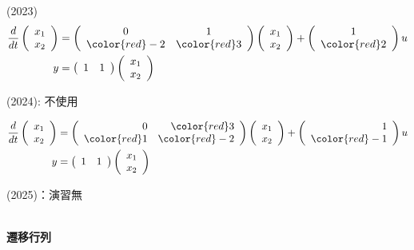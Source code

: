 (2023)
\begin{align*}
	\frac{d}{dt}
	\left (
	\begin{array}{c}
	 x_1 \\ x_2 
	\end{array}
	\right )
	& = 
	\left (
	\begin{array}{cc}
	 0 & 1 \\
	 \color{red} -2 & \color{red} 3
	\end{array}
	\right )
	\left (
	\begin{array}{c}
	 x_1 \\ x_2 
	\end{array}
	\right )
	+
	\left (
	\begin{array}{c}
	 1 \\ \color{red} 2
	\end{array}
	\right )
	u
\\
	y 
	&=
	\left (
	\begin{array}{cc}
	 1 & 1  
	\end{array}
	\right )
	\left (
	\begin{array}{c}
	 x_1 \\ x_2 
	\end{array}
	\right )
\end{align*}

(2024): 不使用

\def\chrA{\left(\begin{array}{rr} 0 &  \color{red} 3\\  \color{red} 1 &  \color{red} -2 \end{array}\right)}
\def\chrB{\left(\begin{array}{r} 1\\  \color{red} -1 \end{array}\right)}
\def\chrC{\left(\begin{array}{rr} 1 & 1 \end{array}\right)}
\def\statev{
	\left (
	\begin{array}{c}
	 x_1 \\ x_2 
	\end{array}
	\right )
}

\begin{align*}
	\frac{d}{dt} \statev 
	&= \chrA \statev + \chrB u
\\
	y 
	&= \chrC \statev
\end{align*}

(2025)：演習無

\ \\ \noindent
{\bf 遷移行列}

